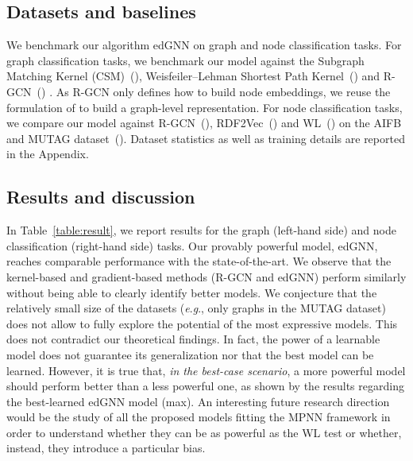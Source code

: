 \documentclass{article} \usepackage{iclr2019_conference,times}
\newcommand{\eg}{\textit{e}.\textit{g}., }
\begin{document}
\subsection{Datasets and baselines}



We benchmark our algorithm edGNN on graph and node classification tasks.
For graph classification tasks, we benchmark our model against the Subgraph Matching Kernel (CSM)~(\cite{Kriege2012}), Weisfeiler--Lehman Shortest Path Kernel~(\cite{Shervashidze2011}) and R-GCN~(\cite{Schlichtkrull2018})
. As R-GCN only defines how to build node embeddings, we reuse the formulation of \cite{Xu2018} to build a graph-level representation. For node classification tasks, we compare our model against R-GCN~(\cite{Schlichtkrull2018}), RDF2Vec~(\cite{Ristoski2016a}) and WL~(\cite{Shervashidze2011, DeVries2015}) on the AIFB and MUTAG dataset~(\cite{Ristoski2016b}). 
Dataset statistics as well as training details are reported in the Appendix.



\subsection{Results and discussion}



In Table~\ref{table:result}, we report results for the graph (left-hand side) and node classification (right-hand side) tasks. Our provably powerful model, edGNN, reaches comparable performance with the state-of-the-art. We observe that the kernel-based and gradient-based methods (R-GCN and edGNN) perform similarly without being able to clearly identify better models. We conjecture that the relatively small size of the datasets (\eg only  graphs in the MUTAG dataset) does not allow to fully explore the potential of the most expressive models.
This does not contradict our theoretical findings. In fact, the power of a learnable model does not guarantee its generalization nor that the best model can be learned. However, it is true that, \emph{in the best-case scenario}, a more powerful model should perform better than a less powerful one, as shown by the results regarding the best-learned edGNN model (max).
An interesting future research direction would be the study of all the proposed models fitting the MPNN framework in order to understand whether they can be as powerful as the WL test or whether, instead, they introduce a particular bias. 
\end{document}
